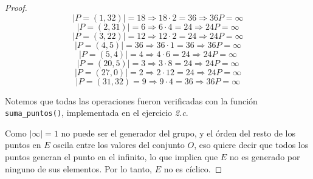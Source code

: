 \documentclass[letterpaper,11pt]{article}
\begin{document}
\begin{enumerate}
\begin{enumerate}
\begin{proof}
            \newpage
            \begin{equation*}
                |P = (1, 32)| = 18 \Rightarrow 18 \cdot 2 = 36 \Rightarrow 
                36P = \infty 
            \end{equation*}
            \begin{equation*}
                |P = (2, 31)| = 6 \Rightarrow 6 \cdot 4 = 24 \Rightarrow 
                24P = \infty
            \end{equation*}
            \begin{equation*}
                |P = (3, 22)| = 12 \Rightarrow 12 \cdot 2 = 24 \Rightarrow
                24P = \infty
            \end{equation*}
            \begin{equation*}
                |P = (4, 5)| = 36 \Rightarrow 36 \cdot 1 = 36 \Rightarrow
                36P = \infty
            \end{equation*}
            \begin{equation*}
                |P = (5, 4)| = 4 \Rightarrow 4 \cdot 6 = 24 \Rightarrow
                24P = \infty
            \end{equation*}
            \begin{equation*}
                |P = (20, 5)| = 3 \Rightarrow 3 \cdot 8 = 24 \Rightarrow
                24P = \infty
            \end{equation*}
            \begin{equation*}
                |P = (27, 0)| = 2 \Rightarrow 2 \cdot 12 = 24 \Rightarrow
                24P = \infty
            \end{equation*}
            \begin{equation*}
                |P = (31, 32) = 9 \Rightarrow 9 \cdot 4 = 36 \Rightarrow
                36P = \infty
            \end{equation*}
            
            Notemos que todas las operaciones fueron verificadas con la función 
            \texttt{suma\_puntos()}, implementada en el ejercicio \textit{2.c}. 
            
            Como $|\infty| = 1$ no puede ser el generador del grupo, y el órden
            del resto de los puntos en $E$ oscila entre los valores del conjunto
            $O$, eso quiere decir que todos los puntos generan el punto en el 
            infinito, lo que implica que $E$ no es generado por ninguno de sus 
            elementos. Por lo tanto, $E$ no es cíclico.
            

\end{proof}
\end{enumerate}
\end{enumerate}
\end{document}
